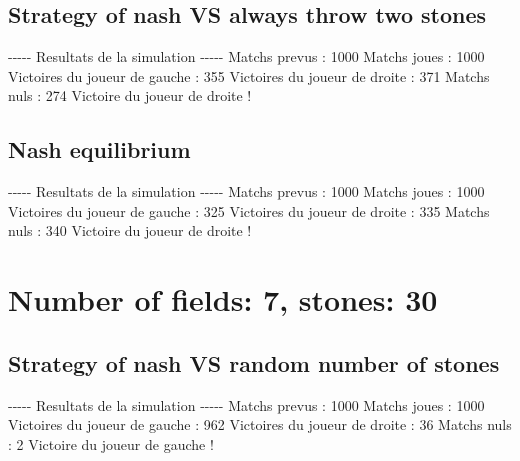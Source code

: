 \documentclass{article}%
\begin{document}
%
\subsection{Strategy of nash VS always throw two stones}%
\label{subsec:Strategy of nash VS always throw two stones}%
{-}{-}{-}{-}{-} Resultats de la simulation {-}{-}{-}{-}{-}\newline%
		\newline%
Matchs prevus : 1000\newline%
Matchs joues : 1000\newline%
\newline%
Victoires du joueur de gauche : 355\newline%
Victoires du joueur de droite : 371\newline%
Matchs nuls : 274\newline%
\newline%
Victoire du joueur de droite !

%
\subsection{Nash equilibrium}%
\label{subsec:Nash equilibrium}%
{-}{-}{-}{-}{-} Resultats de la simulation {-}{-}{-}{-}{-}\newline%
		\newline%
Matchs prevus : 1000\newline%
Matchs joues : 1000\newline%
\newline%
Victoires du joueur de gauche : 325\newline%
Victoires du joueur de droite : 335\newline%
Matchs nuls : 340\newline%
\newline%
Victoire du joueur de droite !

%
\section{Number of fields: 7, stones: 30}%
\label{sec:Number of fields 7, stones 30}%
\subsection{Strategy of nash VS random number of stones}%
\label{subsec:Strategy of nash VS random number of stones}%
{-}{-}{-}{-}{-} Resultats de la simulation {-}{-}{-}{-}{-}\newline%
		\newline%
Matchs prevus : 1000\newline%
Matchs joues : 1000\newline%
\newline%
Victoires du joueur de gauche : 962\newline%
Victoires du joueur de droite : 36\newline%
Matchs nuls : 2\newline%
\newline%
Victoire du joueur de gauche !
\end{document}
